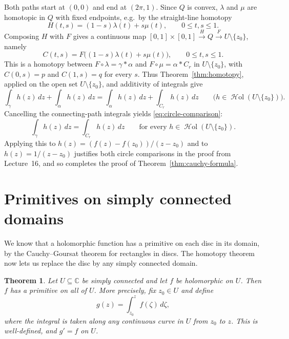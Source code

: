 \documentclass[11pt]{article}
\theoremstyle{plain}
\newtheorem{theorem}{Theorem}[section]
\theoremstyle{definition}
\theoremstyle{remark}
\numberwithin{equation}{section}
\newcommand{\C}{\mathbb{C}}
\DeclareMathOperator{\Hol}{\mathcal{H}\mathrm{ol}}
\begin{document}
Both paths start at $(0,0)$ and end at $(2\pi,1)$. Since $Q$ is convex,
$\lambda$ and $\mu$ are homotopic in $Q$ with fixed endpoints, e.g.\ by
the straight-line homotopy
\[
 H(t,s)=(1-s)\lambda(t)+s\mu(t),\qquad 0\leq t,s\leq1.
\]
Composing $H$ with $F$ gives a continuous map
$[0,1]\times[0,1]\xrightarrow{H}Q\xrightarrow{F}U\setminus\{z_0\}$,
namely
\[
 C(t,s)=F\bigl((1-s)\lambda(t)+s\mu(t)\bigr),
 \qquad 0\leq t,s\leq1.
\]
This is a homotopy between $F\circ\lambda=\gamma*\alpha$ and
$F\circ\mu=\alpha*C_r$ in $U\setminus\{z_0\}$, with
$C(0,s)=p$ and $C(1,s)=q$ for every $s$.
Thus Theorem~\ref{thm:homotopy}, applied on the open set
$U\setminus\{z_0\}$, and additivity of integrals give
\[
 \int_\gamma h(z)\,dz+\int_\alpha h(z)\,dz
 =\int_\alpha h(z)\,dz+\int_{C_r}h(z)\,dz
 \qquad\bigl(h\in\Hol(U\setminus\{z_0\})\bigr).
\]
Cancelling the connecting-path integrals yields
\eqref{eq:circle-comparison}:
\[
 \int_\gamma h(z)\,dz=\int_{C_r}h(z)\,dz
 \qquad\text{for every }h\in\Hol(U\setminus\{z_0\}).
\]
Applying this to $h(z)=(f(z)-f(z_0))/(z-z_0)$ and to $h(z)=1/(z-z_0)$
justifies both circle comparisons in the proof from Lecture~16, and so
completes the proof of Theorem~\ref{thm:cauchy-formula}.
%
%
%

\section{Primitives on simply connected domains}
We know that a holomorphic function has a primitive on each disc in
its domain, by the Cauchy--Goursat theorem for rectangles in discs.
The homotopy theorem now lets us replace the disc by any simply connected domain.

\begin{theorem}\label{thm:global-primitive}
Let $U\subseteq\C$ be simply connected and let $f$ be holomorphic on
$U$. Then $f$ has a primitive on all of $U$.
More precisely, fix $z_0\in U$ and define
\[
 g(z)=\int_{z_0}^z f(\zeta)\,d\zeta,
\]
where the integral is taken along any continuous curve in $U$ from
$z_0$ to $z$. This is well-defined, and $g'=f$ on $U$.
\end{theorem}
\end{document}
